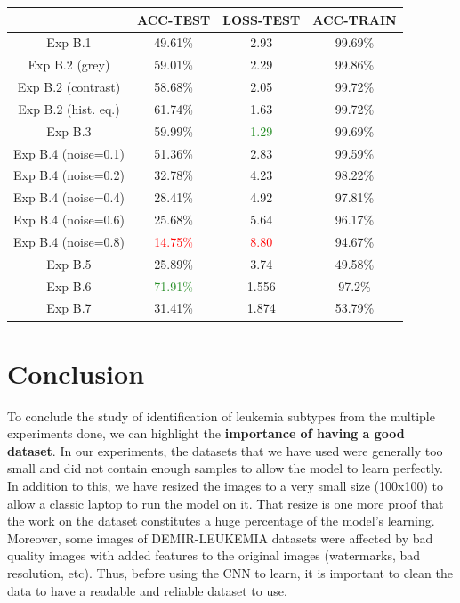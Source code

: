 \documentclass[11pt, openany]{report}
\theoremstyle{plain}
\theoremstyle{definition}
\theoremstyle{remark}
\begin{document}
\begin{center}
\begin{tabular}{|c|c|c|c|}
  \hline
          & \textbf{ACC-TEST} & \textbf{LOSS-TEST} & \textbf{ACC-TRAIN} \\
  \hline
  Exp B.1 & 49.61\% & 2.93 & 99.69\% \\
  \hline
  Exp B.2 (grey) & 59.01\% & 2.29 & 99.86\%  \\ 
  Exp B.2 (contrast) & 58.68\% & 2.05 & 99.72\% \\ 
  Exp B.2 (hist. eq.) & 61.74\% & 1.63 & 99.72\% \\ 
  \hline
  Exp B.3 & 59.99\% & \textcolor{ForestGreen}{1.29} & 99.69\% \\
  \hline
  Exp B.4 (noise=0.1) & 51.36\% & 2.83 & 99.59\%  \\ 
  Exp B.4 (noise=0.2) & 32.78\% & 4.23 & 98.22\% \\ 
  Exp B.4 (noise=0.4) & 28.41\% & 4.92 & 97.81\% \\
  Exp B.4 (noise=0.6) & 25.68\% & 5.64 & 96.17\%  \\ 
  Exp B.4 (noise=0.8) & \textcolor{red}{14.75\%} & \textcolor{red}{8.80} & 94.67\% \\
  \hline 
  Exp B.5 & 25.89\% & 3.74 & 49.58\% \\
  \hline
  Exp B.6 & \textcolor{ForestGreen}{71.91\%} & 1.556 & 97.2\% \\
  \hline
  Exp B.7 & 31.41\% & 1.874 & 53.79\% \\ 
  \hline
\end{tabular}
\label{table:summary-allidb-demir}
\end{center}

\newpage
\section{Conclusion}

To conclude the study of identification of leukemia subtypes from the multiple experiments done, we can highlight the \textbf{importance of having a good dataset}. In our experiments, the datasets that we have used were generally too small and did not contain enough samples to allow the model to learn perfectly. In addition to this, we have resized the images to a very small size (100x100) to allow a classic laptop to run the model on it. That resize is one more proof that the work on the dataset constitutes a huge percentage of the model's learning. Moreover, some images of DEMIR-LEUKEMIA datasets were affected by bad quality images with added features to the original images (watermarks, bad resolution, etc). Thus, before using the CNN to learn, it is important to clean the data to have a readable and reliable dataset to use.\\
\end{document}
